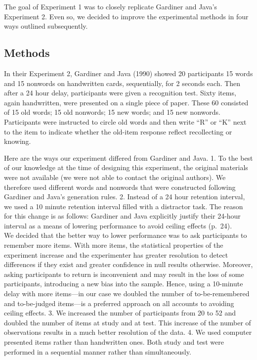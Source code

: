 \documentclass[english,,man,floatsintext]{apa6}
\begin{document}
The goal of Experiment 1 was to closely replicate Gardiner and Java's Experiment 2. Even so, we decided to improve the experimental methods in four ways outlined subsequently.

\hypertarget{methods}{%
\subsection{Methods}\label{methods}}

In their Experiment 2, Gardiner and Java (1990) showed 20 participants 15 words and 15 nonwords on handwritten cards, sequentially, for 2 seconds each. Then after a 24 hour delay, participants were given a recognition test. Sixty items, again handwritten, were presented on a single piece of paper. These 60 consisted of 15 old words; 15 old nonwords; 15 new words; and 15 new nonwords. Participants were instructed to circle old words and then write \enquote{R} or \enquote{K} next to the item to indicate whether the old-item response reflect recollecting or knowing.

Here are the ways our experiment differed from Gardiner and Java. 1. To the best of our knowledge at the time of designing this experiment, the original materials were not available (we were not able to contact the original authors). We therefore used different words and nonwords that were constructed following Gardiner and Java's generation rules. 2. Instead of a 24 hour retention interval, we used a 10 minute retention interval filled with a distractor task. The reason for this change is as follows: Gardiner and Java explicitly justify their 24-hour interval as a means of lowering performance to avoid ceiling effects (p.~24).\\
We decided that the better way to lower performance was to ask participants to remember more items. With more items, the statistical properties of the experiment increase and the experimenter has greater resolution to detect differences if they exist and greater confidence in null results otherwise. Moreover, asking participants to return is inconvenient and may result in the loss of some participants, introducing a new bias into the sample. Hence, using a 10-minute delay with more items---in our case we doubled the number of to-be-remembered and to-be-judged items---is a preferred approach on all accounts to avoiding ceiling effects. 3. We increased the number of participants from 20 to 52 and doubled the number of items at study and at test. This increase of the number of observations results in a much better resolution of the data. 4. We used computer presented items rather than handwritten ones. Both study and test were performed in a sequential manner rather than simultaneously.
\end{document}
